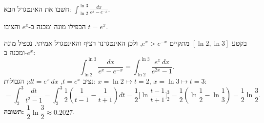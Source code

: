 
\begin{question}
חשבו את האינטגרל הבא: $\displaystyle\int_{\ln2}^{\ln3}\frac{dx}{e^x-e^{-x}}$.
\end{question}

\begin{hint}
הכפילו מונה ומכנה ב-$e^x$ והציבו $t=e^x$.
\end{hint}

\begin{solution}
בקטע $[\ln2,\ln3]$ מתקיים $e^x>e^{-x}$, ולכן האינטגרנד רציף והאינטגרל אמיתי. נכפיל מונה ומכנה ב-$e^x$:
\[ \int_{\ln2}^{\ln3}\frac{dx}{e^x-e^{-x}} = \int_{\ln2}^{\ln3}\frac{e^x\,dx}{e^{2x}-1}. \]
נציב $t=e^x$, $dt=e^x\,dx$; הגבולות: $x=\ln2\mapsto t=2$, $x=\ln3\mapsto t=3$:
\[ = \int_2^3\frac{dt}{t^2-1} = \int_2^3\frac12\left(\frac{1}{t-1}-\frac{1}{t+1}\right)dt = \frac12\Big[\ln\frac{t-1}{t+1}\Big]_2^3 = \frac12\left(\ln\frac12-\ln\frac13\right) = \frac12\ln\frac32. \]
\textbf{תשובה:} $\dfrac12\ln\dfrac32\approx0.2027$.
\end{solution}
